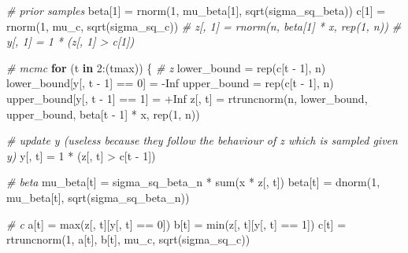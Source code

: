 \documentclass[
  11pt,
]{article}
\newenvironment{Shaded}{\begin{snugshade}}{\end{snugshade}}
\newcommand{\CommentTok}[1]{\textcolor[rgb]{0.56,0.35,0.01}{\textit{#1}}}
\newcommand{\ConstantTok}[1]{\textcolor[rgb]{0.00,0.00,0.00}{#1}}
\newcommand{\ControlFlowTok}[1]{\textcolor[rgb]{0.13,0.29,0.53}{\textbf{#1}}}
\newcommand{\DecValTok}[1]{\textcolor[rgb]{0.00,0.00,0.81}{#1}}
\newcommand{\FunctionTok}[1]{\textcolor[rgb]{0.00,0.00,0.00}{#1}}
\newcommand{\NormalTok}[1]{#1}
\newcommand{\OtherTok}[1]{\textcolor[rgb]{0.56,0.35,0.01}{#1}}
\newcommand{\SpecialCharTok}[1]{\textcolor[rgb]{0.00,0.00,0.00}{#1}}
\begin{document}
\begin{Shaded}
\begin{Highlighting}[]
\CommentTok{\# prior samples}
\NormalTok{beta[}\DecValTok{1}\NormalTok{] }\OtherTok{=} \FunctionTok{rnorm}\NormalTok{(}\DecValTok{1}\NormalTok{, mu\_beta[}\DecValTok{1}\NormalTok{], }\FunctionTok{sqrt}\NormalTok{(sigma\_sq\_beta))}
\NormalTok{c[}\DecValTok{1}\NormalTok{] }\OtherTok{=} \FunctionTok{rnorm}\NormalTok{(}\DecValTok{1}\NormalTok{, mu\_c, }\FunctionTok{sqrt}\NormalTok{(sigma\_sq\_c))}
\CommentTok{\# z[, 1] = rnorm(n, beta[1] * x, rep(1, n))}
\CommentTok{\# y[, 1] = 1 * (z[, 1] \textgreater{} c[1])}

\CommentTok{\# mcmc}
\ControlFlowTok{for}\NormalTok{ (t }\ControlFlowTok{in} \DecValTok{2}\SpecialCharTok{:}\NormalTok{(tmax)) \{}
    \CommentTok{\# z}
\NormalTok{    lower\_bound }\OtherTok{=} \FunctionTok{rep}\NormalTok{(c[t }\SpecialCharTok{{-}} \DecValTok{1}\NormalTok{], n)}
\NormalTok{    lower\_bound[y[, t }\SpecialCharTok{{-}} \DecValTok{1}\NormalTok{] }\SpecialCharTok{==} \DecValTok{0}\NormalTok{] }\OtherTok{=} \SpecialCharTok{{-}}\ConstantTok{Inf}
\NormalTok{    upper\_bound }\OtherTok{=} \FunctionTok{rep}\NormalTok{(c[t }\SpecialCharTok{{-}} \DecValTok{1}\NormalTok{], n)}
\NormalTok{    upper\_bound[y[, t }\SpecialCharTok{{-}} \DecValTok{1}\NormalTok{] }\SpecialCharTok{==} \DecValTok{1}\NormalTok{] }\OtherTok{=} \SpecialCharTok{+}\ConstantTok{Inf}
\NormalTok{    z[, t] }\OtherTok{=} \FunctionTok{rtruncnorm}\NormalTok{(n, lower\_bound, upper\_bound, beta[t }\SpecialCharTok{{-}} \DecValTok{1}\NormalTok{] }\SpecialCharTok{*}\NormalTok{ x, }\FunctionTok{rep}\NormalTok{(}\DecValTok{1}\NormalTok{, n))}

    \CommentTok{\# update y (useless because they follow the behaviour of z which is sampled given y)}
\NormalTok{    y[, t] }\OtherTok{=} \DecValTok{1} \SpecialCharTok{*}\NormalTok{ (z[, t] }\SpecialCharTok{\textgreater{}}\NormalTok{ c[t }\SpecialCharTok{{-}} \DecValTok{1}\NormalTok{])}

    \CommentTok{\# beta}
\NormalTok{    mu\_beta[t] }\OtherTok{=}\NormalTok{ sigma\_sq\_beta\_n }\SpecialCharTok{*} \FunctionTok{sum}\NormalTok{(x }\SpecialCharTok{*}\NormalTok{ z[, t])}
\NormalTok{    beta[t] }\OtherTok{=} \FunctionTok{dnorm}\NormalTok{(}\DecValTok{1}\NormalTok{, mu\_beta[t], }\FunctionTok{sqrt}\NormalTok{(sigma\_sq\_beta\_n))}

    \CommentTok{\# c}
\NormalTok{    a[t] }\OtherTok{=} \FunctionTok{max}\NormalTok{(z[, t][y[, t] }\SpecialCharTok{==} \DecValTok{0}\NormalTok{])}
\NormalTok{    b[t] }\OtherTok{=} \FunctionTok{min}\NormalTok{(z[, t][y[, t] }\SpecialCharTok{==} \DecValTok{1}\NormalTok{])}
\NormalTok{    c[t] }\OtherTok{=} \FunctionTok{rtruncnorm}\NormalTok{(}\DecValTok{1}\NormalTok{, a[t], b[t], mu\_c, }\FunctionTok{sqrt}\NormalTok{(sigma\_sq\_c))}


\end{Highlighting}
\end{Shaded}
\end{document}

